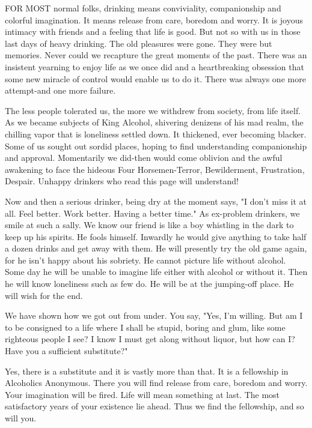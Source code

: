 
\bbChapterPreamble


\begin{biblechapter}
FOR MOST normal folks, drinking means conviviality, companionship and colorful imagination.  It means release from care, boredom and worry.  It is joyous intimacy with friends and a feeling that life is good.  But not so with us in those last days of heavy drinking.  The old pleasures were gone.  They were but memories.  Never could we recapture the great moments of the past.  There was an insistent yearning to enjoy life as we once did and a heartbreaking obsession that some new miracle of control would enable us to do it.  There was always one more attempt-and one more failure.

The less people tolerated us, the more we withdrew from society, from life itself.  As we became subjects of King Alcohol, shivering denizens of his mad realm, the chilling vapor that is loneliness settled down.  It thickened, ever becoming blacker.  Some of us sought out sordid places, hoping to find understanding companionship and approval.  Momentarily we did-then would come oblivion and the awful awakening to face the hideous Four Horsemen-Terror, Bewilderment, Frustration, Despair.  Unhappy drinkers who read this page will understand!

Now and then a serious drinker, being dry at the moment says, "I don't miss it at all.  Feel better.  Work better.  Having a better time."  As ex-problem drinkers, we smile at such a sally.  We know our friend is like a boy whistling in the dark to keep up his spirits.  He fools himself.  Inwardly he would give anything to take half a dozen drinks and get away with them.  He will presently try the old game again, for he isn't happy about his sobriety.  He cannot picture life without alcohol.  Some day he will be unable to imagine life either with alcohol or without it.  Then he will know loneliness such as few do.  He will be at the jumping-off place.  He will wish for the end.

We have shown how we got out from under.  You say, "Yes, I'm willing.  But am I to be consigned to a life where I shall be stupid, boring and glum, like some righteous people I see?  I know I must get along without liquor, but how can I?  Have you a sufficient substitute?"

Yes, there is a substitute and it is vastly more than that.  It is a fellowship in Alcoholics Anonymous.  There you will find release from care, boredom and worry.  Your imagination will be fired.  Life will mean something at last.  The most satisfactory years of your existence lie ahead.  Thus we find the fellowship, and so will you.


\end{biblechapter}
